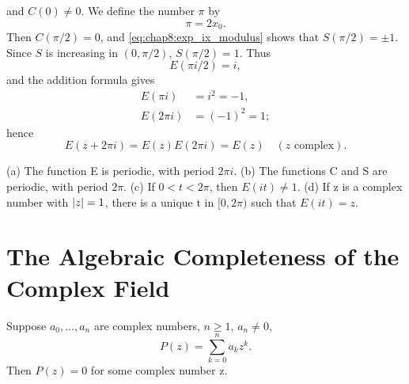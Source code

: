 and $C(0) \ne 0$. We define the number $\pi$ by
\begin{equation} \label{eq:chap8:pi_definition}
  \pi = 2x_0.
\end{equation}
Then $C(\pi/2)=0$, and \eqref{eq:chap8:exp_ix_modulus} shows that
$S(\pi/2)=\pm 1$. Since $S$ is increasing in $(0, \pi/2)$, $S(\pi/2)=1$. Thus
\[ E(\pi i / 2) = i, \]
and the addition formula gives
\begin{align}
  E(\pi i) &= i^2 = -1, \label{eq:chap8:exp_ipi} \\
  E(2\pi i) &= (-1)^2 = 1; \label{eq:chap8:exp_2ipi}
\end{align}
hence
\begin{equation} \label{eq:chap8:exp_periodicity}
  E(z + 2\pi i) = E(z)E(2\pi i) = E(z) \quad (z \text{ complex}).
\end{equation}

\begin{theorem}[Properties of E, C, S] %
  \label{thm:chap8:trig_props}
  (a) The function E is periodic, with period $2\pi i$.
  (b) The functions C and S are periodic, with period $2\pi$.
  (c) If $0 < t < 2\pi$, then $E(it) \ne 1$.
  (d) If z is a complex number with $\left\lvert z \right\rvert=1$, there is a unique t
  in $[0, 2\pi)$ such that $E(it)=z$.
\end{theorem}




\section{The Algebraic Completeness of the Complex Field}
\label{sec:chap8:algebraic_completeness}


\begin{theorem} %
  \label{thm:chap8:fta}
  Suppose $a_0, \dots, a_n$ are complex numbers, $n \ge 1$, $a_n \ne 0$,
  \[ P(z) = \sum_{k=0}^n a_k z^k. \]
  Then $P(z)=0$ for some complex number z.
\end{theorem}

